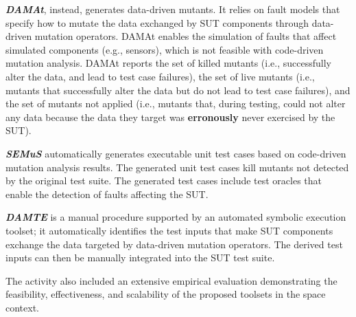 \documentclass[a4paper]{report}
\begin{document}
\textbf{\emph{DAMAt}}, instead, generates data-driven mutants. 
It relies on fault models that specify how to mutate the data exchanged by SUT components through data-driven mutation operators. 
DAMAt enables the simulation of faults that affect simulated components (e.g., sensors), which is not feasible with code-driven mutation analysis. 
DAMAt reports the set of killed mutants (i.e., successfully alter the data, and lead to test case failures), the set of live mutants (i.e., mutants that successfully alter the data but do not lead to test case failures), and the set of mutants not applied (i.e., mutants that, during testing, could not alter any data because the data they target was \textbf{erronously} never exercised by the SUT). 

\textbf{\emph{SEMuS}} automatically generates executable unit test cases based on code-driven mutation analysis results. The generated unit test cases kill mutants not detected by the original test suite. The generated test cases include test oracles that enable the detection of faults affecting the SUT.


\textbf{\emph{DAMTE}} is a manual procedure supported by an automated symbolic execution toolset; it automatically identifies the test inputs that make SUT components exchange the data targeted by data-driven mutation operators. The derived test inputs can then be manually integrated into the SUT test suite.
 
The activity also included an extensive empirical evaluation demonstrating the feasibility, effectiveness, and scalability of the proposed toolsets in the space context.
\end{document}
